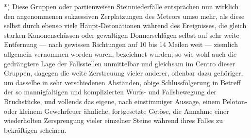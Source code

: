 \documentclass[a4paper, 11pt, oneside, german]{article}
\begin{document}
*) Diese Gruppen oder partienweisen Steinniederfälle entsprächen nun wirklich den angenommenen sukzessiven Zerplatzungen des Meteors umso mehr, als diese selbst durch ebenso viele Haupt-Detonationen während des Ereignisses, die gleich starken Kanonenschüssen oder gewaltigen Donnerschlägen selbst auf sehr weite Entfernung --- nach gewissen Richtungen auf 10 bis 14 Meilen weit --- ziemlich allgemein vernommen worden waren, bezeichnet wurden; so wie wohl auch die gedrängtere Lage der Fallsstellen unmittelbar und gleichsam im Centro dieser Gruppen, dagegen die weite Zerstreuung vieler anderer, offenbar dazu gehöriger, um dasselbe in sehr verschiedenen Abständen, obige Schlussfolgerung in Betreff der so mannigfaltigen und komplizierten Wurfs- und Fallsbewegung der Bruchstücke, und vollends das eigene, nach einstimmiger Aussage, einem Peloton- oder kleinem Gewehrfeuer ähnliche, fortgesetzte Getöse, die Annahme einer wiederholten Zersprengung vieler einzelner Steine während ihres Falles zu bekräftigen scheinen.
\end{document}
